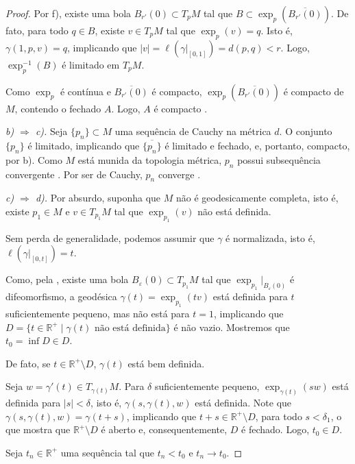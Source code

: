 \begin{theorem}
\begin{proof}
        Por f), existe uma bola $B_{r'}(0) \subset T_pM$ tal que $B \subset \exp_p(\overline{B_{r'}(0)})$. De fato, para todo $q \in B$, existe $v \in T_pM$ tal que $\exp_p(v) = q$. Isto é, $\gamma(1,p,v) = q$, implicando que $|v| = \ell(\gamma|_{[0,1]}) = d(p,q) < r$. Logo, $\exp_p^{-1}(B)$ é limitado em $T_pM$.

        Como $\exp_p$ é contínua e $\overline{B_{r'}(0)}$ é compacto, $\exp_p(\overline{B_{r'}(0)})$ é compacto de $M$, contendo o fechado $A$. Logo, $A$ é compacto \cite{munkres2000topology}.

        \emph{b) $\Rightarrow$ c).} Seja $\{p_n\} \subset M$ uma sequência de Cauchy na métrica $d$. O conjunto $\{p_n\}$ é limitado, implicando que $\overline{\{p_n\}}$ é limitado e fechado, e, portanto, compacto, por b).
        Como $M$ está munida da topologia métrica, $p_n$ possui subsequência convergente \cite{munkres2000topology}. Por ser de Cauchy, $p_n$ converge \cite{lima2020espacos}.

        \emph{c) $\Rightarrow$ d).} Por absurdo, suponha que $M$ não é geodesicamente completa, isto é, existe $p_1 \in M$ e $v \in T_{p_1}M$ tal que $\exp_{p_1}(v)$ não está definida.

        Sem perda de generalidade, podemos assumir que $\gamma$ é normalizada, isto é, $\ell(\gamma|_{[0,t]}) = t$.

        Como, pela , existe uma bola $B_\varepsilon(0) \subset T_{p_1}M$ tal que $\exp_{p_1}|_{B_\varepsilon(0)}$ é difeomorfismo, a geodésica $\gamma(t) = \exp_{p_1}(tv)$ está definida para $t$ suficientemente pequeno, mas não está para $t = 1$, implicando que $D = \{t \in \mathbb{R}^+ \mid \gamma(t) \text{ não está definida}\}$ é não vazio. Mostremos que $t_0 = \inf D \in D$.

        De fato, se $t \in \mathbb{R}^+ \setminus D$, $\gamma(t)$ está bem definida. %

        Seja $w = \gamma'(t) \in T_{\gamma(t)}M$. Para $\delta$ suficientemente pequeno, $\exp_{\gamma(t)}(sw)$ está definida para $|s| < \delta$, isto é, $\gamma(s, \gamma(t), w)$ está definida. Note que $\gamma(s, \gamma(t), w) = \gamma(t+s)$, implicando que $t + s \in \mathbb{R}^+ \setminus D$, para todo $s < \delta_1$, o que mostra que $\mathbb{R}^+ \setminus D$ é aberto e, consequentemente, $D$ é fechado. Logo, $t_0 \in D$.

        Seja $t_n \in \mathbb{R}^+$ uma sequência tal que $t_n < t_0$ e $t_n \to t_0$.


\end{proof}
\end{theorem}
